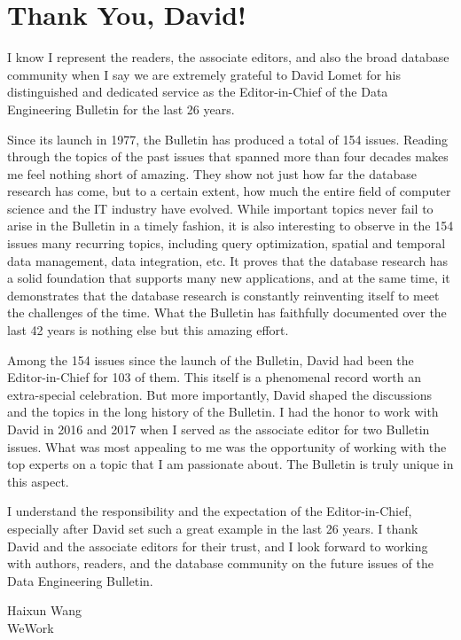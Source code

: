 \documentclass[11pt]{article}
\begin{document}
\section*{Thank You, David!}

I know I represent the readers, the associate editors, and also the
broad database community when I say we are extremely grateful to David
Lomet for his distinguished and dedicated service as the
Editor-in-Chief of the Data Engineering Bulletin for the last 26
years.

Since its launch in 1977, the Bulletin has produced a total of 154
issues. Reading through the topics of the past issues that spanned
more than four decades makes me feel nothing short of amazing. They
show not just how far the database research has come, but to a certain
extent, how much the entire field of computer science and the IT
industry have evolved. While important topics never fail to arise in
the Bulletin in a timely fashion, it is also interesting to observe in
the 154 issues many recurring topics, including query optimization,
spatial and temporal data management, data integration, etc. It proves
that the database research has a solid foundation that supports many
new applications, and at the same time, it demonstrates that the
database research is constantly reinventing itself to meet the
challenges of the time. What the Bulletin has faithfully documented
over the last 42 years is nothing else but this amazing effort.

Among the 154 issues since the launch of the Bulletin, David had been
the Editor-in-Chief for 103 of them. This itself is a phenomenal
record worth an extra-special celebration. But more importantly, David
shaped the discussions and the topics in the long history of the
Bulletin.  I had the honor to work with David in 2016 and 2017 when I
served as the associate editor for two Bulletin issues. What was most
appealing to me was the opportunity of working with the top experts on
a topic that I am passionate about. The Bulletin is truly unique in
this aspect.

I understand the responsibility and the expectation of the
Editor-in-Chief, especially after David set such a great example in
the last 26 years. I thank David and the associate editors for their
trust, and I look forward to working with authors, readers, and the
database community on the future issues of the Data Engineering
Bulletin.

\begin{flushright}
Haixun Wang\\
WeWork
\end{flushright}
\end{document}
